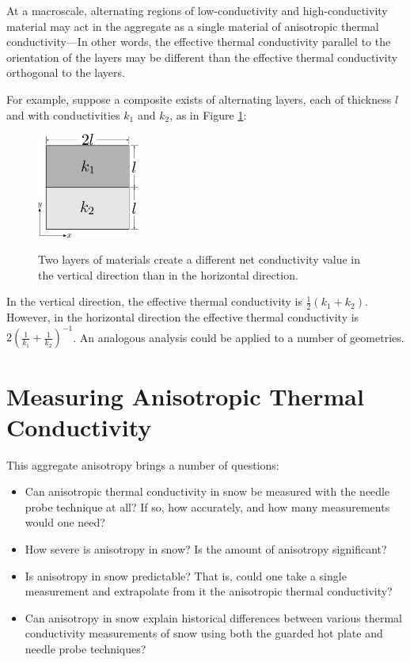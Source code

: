 At a macroscale, alternating regions of low-conductivity and high-conductivity
material may act in the aggregate as a single material of anisotropic thermal
conductivity---In other words, the effective thermal conductivity parallel to
the orientation of the layers may be different than the effective thermal
conductivity orthogonal to the layers.

For example, suppose a composite exists of alternating layers, each of thickness
\(l\) and with conductivities \(k_1\) and \(k_2\), as in Figure
\ref{fig:ex_laminate}:

\begin{figure}[h]
\centering
\includegraphics[width=0.3\textwidth]{fig/ex_laminate.png}
\label{fig:ex_laminate}
\caption{Two layers of materials create a different net conductivity value in the vertical direction than in the horizontal direction.}
\end{figure}

In the vertical direction, the effective thermal conductivity is
\(\frac12(k_1 + k_2)\). However, in the horizontal direction the effective
thermal conductivity is \(2\left( \frac1{k_1} + \frac1{k_2} \right)^{-1}\). An analogous analysis could be applied to a number of geometries.


\section{Measuring Anisotropic Thermal Conductivity}

This aggregate anisotropy brings a number of questions:

\begin{itemize}
\item Can anisotropic thermal conductivity in snow be measured with the needle
probe technique at all? If so, how accurately, and how many measurements would
one need?
\item How severe is anisotropy in snow? Is the amount of anisotropy
significant?
\item Is anisotropy in snow predictable? That is, could one take a single
measurement and extrapolate from it the anisotropic thermal conductivity?
\item Can anisotropy in snow explain historical differences between various
thermal conductivity measurements of snow using both the guarded hot plate and
needle probe techniques?
\end{itemize}

